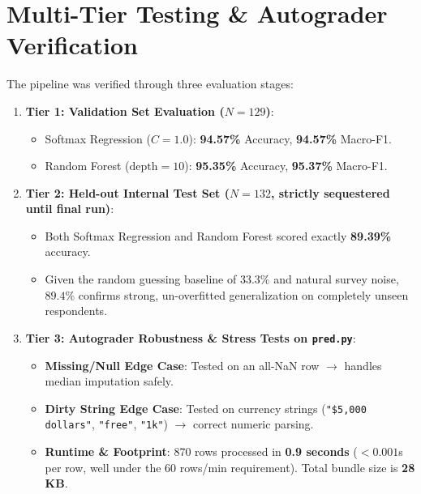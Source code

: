 \documentclass[11pt,a4paper]{article}
\begin{document}
\section{Multi-Tier Testing \& Autograder Verification}
The pipeline was verified through three evaluation stages:
\begin{enumerate}
    \item \textbf{Tier 1: Validation Set Evaluation ($N=129$)}:
    \begin{itemize}
        \item Softmax Regression ($C=1.0$): \textbf{94.57\%} Accuracy, \textbf{94.57\%} Macro-F1.
        \item Random Forest ($\text{depth}=10$): \textbf{95.35\%} Accuracy, \textbf{95.37\%} Macro-F1.
    \end{itemize}
    \item \textbf{Tier 2: Held-out Internal Test Set ($N=132$, strictly sequestered until final run)}:
    \begin{itemize}
        \item Both Softmax Regression and Random Forest scored exactly \textbf{89.39\%} accuracy.
        \item Given the random guessing baseline of $33.3\%$ and natural survey noise, $89.4\%$ confirms strong, un-overfitted generalization on completely unseen respondents.
    \end{itemize}
    \item \textbf{Tier 3: Autograder Robustness \& Stress Tests on \texttt{pred.py}}:
    \begin{itemize}
        \item \textbf{Missing/Null Edge Case}: Tested on an all-NaN row $\rightarrow$ handles median imputation safely.
        \item \textbf{Dirty String Edge Case}: Tested on currency strings (\texttt{"\$5,000 dollars"}, \texttt{"free"}, \texttt{"1k"}) $\rightarrow$ correct numeric parsing.
        \item \textbf{Runtime \& Footprint}: 870 rows processed in \textbf{0.9 seconds} ($<0.001$s per row, well under the 60 rows/min requirement). Total bundle size is \textbf{28 KB}.
    \end{itemize}
\end{enumerate}

\end{document}
